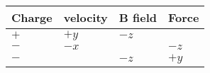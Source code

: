 		\begin{tabular}{||l|l|l|l||} \hline
		 Charge &  velocity & B field & Force\\ \hline\hline
		 $ + $ & $ +y $ & $ -z $ &        \\ \hline
		 $ - $ & $ -x $ &        &  $ -z $\\  \hline 
		 $ - $ &        & $ -z $ &  $ +y $\\  \hline 
		\end{tabular}
